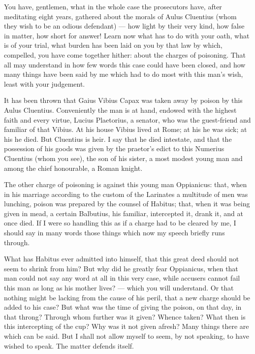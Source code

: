 You have, gentlemen, what in the whole case the prosecutors have, after meditating eight years, gathered about the morals of Aulus Cluentius (whom they wish to be an odious defendant) --- how light by their very kind, how false in matter, how short for answer! Learn now what has to do with your oath, what is of your trial, what burden has been laid on you by that law by which, compelled, you have come together hither: about the charges of poisoning. That all may understand in how few words this case could have been closed, and how many things have been said by me which had to do most with this man's wish, least with your judgement.

 It has been thrown that Gaius Vibius Capax was taken away by poison by this Aulus Cluentius. Conveniently the man is at hand, endowed with the highest faith and every virtue, Lucius Plaetorius, a senator, who was the guest-friend and familiar of that Vibius. At his house Vibius lived at Rome; at his he was sick; at his he died. But Cluentius is heir. I say that he died intestate, and that the possession of his goods was given by the praetor's edict to this Numerius Cluentius (whom you see), the son of his sister, a most modest young man and among the chief honourable, a Roman knight.

 The other charge of poisoning is against this young man Oppianicus: that, when in his marriage according to the custom of the Larinates a multitude of men was lunching, poison was prepared by the counsel of Habitus; that, when it was being given in mead, a certain Balbutius, his familiar, intercepted it, drank it, and at once died. If I were so handling this as if a charge had to be cleared by me, I should say in many words those things which now my speech briefly runs through.

 What has Habitus ever admitted into himself, that this great deed should not seem to shrink from him? But why did he greatly fear Oppianicus, when that man could not say any word at all in this very case, while accusers cannot fail this man as long as his mother lives? --- which you will understand. Or that nothing might be lacking from the cause of his peril, that a new charge should be added to his case? But what was the time of giving the poison, on that day, in that throng? Through whom further was it given? Whence taken? What then is this intercepting of the cup? Why was it not given afresh? Many things there are which can be said. But I shall not allow myself to seem, by not speaking, to have wished to speak. The matter defends itself.

